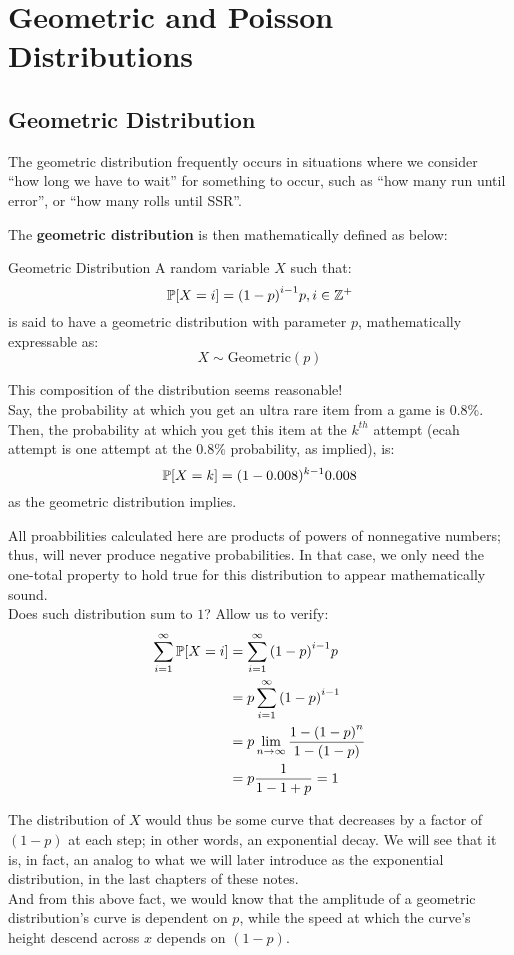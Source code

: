 \chapter{Geometric and Poisson Distributions}

\section{Geometric Distribution}
The geometric distribution frequently occurs in situations where we consider ``how long we have to wait'' for something to occur, such as ``how many run until error'', or ``how many rolls until SSR''.

The \textbf{geometric distribution} is then mathematically defined as below:
\begin{ln-define}{Geometric Distribution}{}
    A random variable $X$ such that:
    \[\P[X = i] = {(1 - p)}^{i - 1} p, i \in \Z^+\]
    is said to have a geometric distribution with parameter $p$, mathematically expressable as:
    \[X \sim \text{Geometric}(p)\]
\end{ln-define}
This composition of the distribution seems reasonable! \\
Say, the probability at which you get an ultra rare item from a game is 0.8\%. Then, the probability at which you get this item at the $k^{th}$ attempt (ecah attempt is one attempt at the $0.8\%$ probability, as implied), is:
\[\P[X = k] = (1 - 0.008)^{k - 1} 0.008\]
as the geometric distribution implies.

All proabbilities calculated here are products of powers of nonnegative numbers; thus, will never produce negative probabilities. In that case, we only need the one-total property to hold true for this distribution to appear mathematically sound. \\
Does such distribution sum to $1$? Allow us to verify:
\begin{align*}
    \sum_{i = 1}^{\infty} \P[X = i]
    &= \sum_{i = 1}^{\infty} {(1 - p)}^{i - 1} p \\
    &= p \sum_{i = 1}^{\infty} {(1 - p)}^{i - 1} \\
    &= p \lim_{n \rightarrow \infty} \frac{1 - {(1 - p)}^{n}}{1 - (1 - p)} \\
    &= p \frac{1}{1 - 1 + p} = 1
\end{align*}

The distribution of $X$ would thus be some curve that decreases by a factor of $(1 - p)$ at each step; in other words, an exponential decay. We will see that it is, in fact, an analog to what we will later introduce as the exponential distribution, in the last chapters of these notes. \\
And from this above fact, we would know that the amplitude of a geometric distribution's curve is dependent on $p$, while the speed at which the curve's height descend across $x$ depends on $(1 - p)$.

